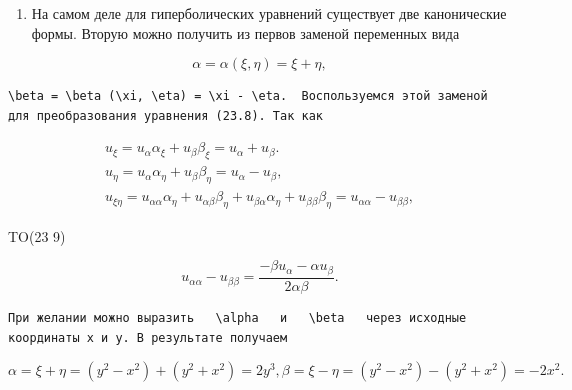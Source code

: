 \documentclass[
  ukrainian,
]{article}
\providecommand{\tightlist}{%
  \setlength{\itemsep}{0pt}\setlength{\parskip}{0pt}}
\begin{document}
\begin{enumerate}
\def\labelenumi{\arabic{enumi}.}
\tightlist
\item
  На самом деле для гиперболических уравнений существует две
  канонические формы. Вторую можно получить из первов заменой переменных
  вида
\end{enumerate}

\[
\alpha = \alpha (\xi, \eta) = \xi + \eta,
\]

\begin{verbatim}
\beta = \beta (\xi, \eta) = \xi - \eta.  Воспользуемся этой заменой для преобразования уравнения (23.8). Так как
\end{verbatim}

\[
\begin{array}{l} u_{\xi} = u_{\alpha}\alpha_{\xi} + u_{\beta}\beta_{\xi} = u_{\alpha} + u_{\beta}. \\ u_{\eta} = u_{\alpha}\alpha_{\eta} + u_{\beta}\beta_{\eta} = u_{\alpha} - u_{\beta}, \\ u_{\xi\eta} = u_{\alpha\alpha}\alpha_{\eta} + u_{\alpha\beta}\beta_{\eta} + u_{\beta\alpha}\alpha_{\eta} + u_{\beta\beta}\beta_{\eta} = u_{\alpha\alpha} - u_{\beta\beta}, \end{array}
\]

TO(23 9)

\[
u_{\alpha\alpha} - u_{\beta\beta} = \frac{-\beta u_{\alpha} - \alpha u_{\beta}}{2\alpha\beta}.
\]

\begin{verbatim}
При желании можно выразить   \alpha   и   \beta   через исходные координаты x и y. В результате получаем
\end{verbatim}

\[
\alpha = \xi + \eta = (y^2 - x^2) + (y^2 + x^2) = 2y^3,
\beta = \xi - \eta = (y^2 - x^2) - (y^2 + x^2) = -2x^2.
\]
\end{document}
